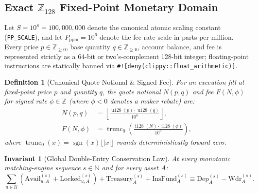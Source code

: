 \documentclass[10pt,twocolumn]{article}
\newtheorem{invariant}{Invariant}[section]
\newtheorem{definition}{Definition}[section]
\begin{document}
\subsection{Exact $\mathbb{Z}_{128}$ Fixed-Point Monetary Domain}
Let $S = 10^8 = 100{,}000{,}000$ denote the canonical atomic scaling constant (\texttt{FP\_SCALE}), and let $P_{\text{ppm}} = 10^6$ denote the fee rate scale in parts-per-million. Every price $p \in \mathbb{Z}_{\ge 0}$, base quantity $q \in \mathbb{Z}_{\ge 0}$, account balance, and fee is represented strictly as a 64-bit or two's-complement 128-bit integer; floating-point instructions are statically banned via \texttt{\#![deny(clippy::float\_arithmetic)]}.

\begin{definition}[Canonical Quote Notional \& Signed Fee]
For an execution fill at fixed-point price $p$ and quantity $q$, the quote notional $N(p, q)$ and fee $F(N, \phi)$ for signed rate $\phi \in \mathbb{Z}$ (where $\phi < 0$ denotes a maker rebate) are:
\begin{align}
  N(p, q) &= \left\lfloor \frac{\operatorname{u128}(p) \cdot \operatorname{u128}(q)}{10^8} \right\rfloor, \label{eq:notional}\\
  F(N, \phi) &= \operatorname{trunc}_0\!\left( \frac{\operatorname{i128}(N) \cdot \operatorname{i128}(\phi)}{10^6} \right), \label{eq:fee}
\end{align}
where $\operatorname{trunc}_0(x) = \operatorname{sgn}(x)\lfloor |x| \rfloor$ rounds deterministically toward zero.
\end{definition}

\begin{invariant}[Global Double-Entry Conservation Law]
At every monotonic matching-engine sequence $s \in \mathbb{N}$ and for every asset $A$:
\begin{equation}
  \sum_{u \in \mathcal{U}} \left( \mathrm{Avail}_{u,A}^{(s)} + \mathrm{Locked}_{u,A}^{(s)} \right) + \mathrm{Treasury}_{A}^{(s)} + \mathrm{InsFund}_{A}^{(s)} \equiv \mathrm{Dep}_{A}^{(s)} - \mathrm{Wdr}_{A}^{(s)}. \label{eq:conservation}
\end{equation}
\end{invariant}
\end{document}

